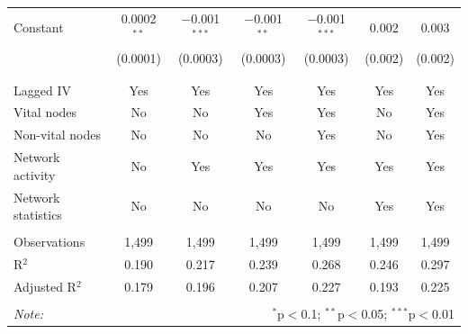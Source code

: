\begin{table}[!htbp]
\begin{tabular}{@{\extracolsep{5pt}}lcccccc}
 Constant & 0.0002$^{**}$ & $-$0.001$^{***}$ & $-$0.001$^{**}$ & $-$0.001$^{***}$ & 0.002 & 0.003 \\ 
  & (0.0001) & (0.0003) & (0.0003) & (0.0003) & (0.002) & (0.002) \\ 
  & & & & & & \\ 
\hline \\[-1.8ex] 
Lagged IV & Yes & Yes & Yes & Yes & Yes & Yes \\ 
Vital nodes & No & No & Yes & Yes & No & Yes \\ 
Non-vital nodes & No & No & No & Yes & No & Yes \\ 
Network activity & No & Yes & Yes & Yes & Yes & Yes \\ 
Network statistics & No & No & No & No & Yes & Yes \\ 
\hline &  &  &  &  &  &  \\ 
Observations & 1,499 & 1,499 & 1,499 & 1,499 & 1,499 & 1,499 \\ 
R$^{2}$ & 0.190 & 0.217 & 0.239 & 0.268 & 0.246 & 0.297 \\ 
Adjusted R$^{2}$ & 0.179 & 0.196 & 0.207 & 0.227 & 0.193 & 0.225 \\ 
\hline 
\hline \\[-1.8ex] 
\textit{Note:}  & \multicolumn{6}{r}{$^{*}$p$<$0.1; $^{**}$p$<$0.05; $^{***}$p$<$0.01} \\ 
\end{tabular} 
\end{table} 
